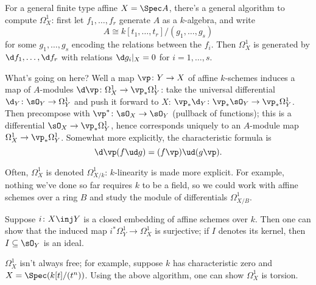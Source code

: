 For a general finite type affine $X = \Spec A$, there's a general algorithm to compute $\Omega_X^1$: first let
$f_1,\dotsc,f_r$ generate $A$ as a $k$-algebra, and write
\begin{equation}
	A\cong k[t_1,\dotsc,t_r]/(g_1,\dotsc,g_s)
\end{equation}
for some $g_1,\dotsc,g_s$ encoding the relations between the $f_i$. Then $\Omega_X^1$ is generated by $\d
f_1,\dotsc,\d f_r$ with relations $\d g_i|_X = 0$ for $i = 1,\dotsc,s$.

What's going on here? Well a map $\vp\colon Y\to X$ of affine $k$-schemes induces a map of $A$-modules $\d\vp\colon
\Omega_X^1\to\vp_*\Omega_Y^1$: take the universal differential $\d_Y\colon\sO_Y\to\Omega_Y^1$ and push it forward
to $X$: $\vp_*\d_Y\colon \vp_*\sO_Y\to\vp_*\Omega_Y^1$. Then precompose with $\vp^*\colon \sO_X\to\sO_Y$ (pullback
of functions); this is a differential $\sO_X\to\vp_*\Omega_Y^1$, hence corresponds uniquely to an $A$-module map
$\Omega_X^1\to\vp_*\Omega_Y^1$. Somewhat more explicitly, the characteristic formula is
\begin{equation}
	\d\vp(f\ud g) = (f\vp)\ud (g\vp).
\end{equation}
\begin{rem}
Often, $\Omega_X^1$ is denoted $\Omega_{X/k}^1$: $k$-linearity is made more explicit. For example, nothing we've
done so far requires $k$ to be a field, so we could work with affine schemes over a ring $B$ and study the module
of differentials $\Omega_{X/B}^1$.
\end{rem}
Suppose $i\colon X\inj Y$ is a closed embedding of affine schemes over $k$.  Then one can show that the induced map
$i^*\Omega_Y^1\to \Omega_X^1$ is surjective; if $I$ denotes its kernel, then $I\subseteq\sO_Y$ is an ideal.
\begin{exm}
$\Omega_X^1$ isn't always free; for example, suppose $k$ has characteristic zero and $X = \Spec(k[t]/(t^n))$. Using
the above algorithm, one can show $\Omega_X^1$ is torsion.
\end{exm}
